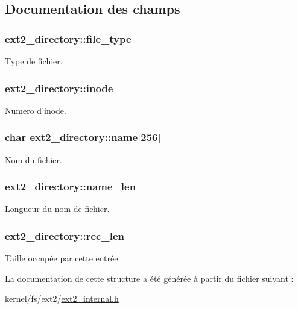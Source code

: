 \subsection{Documentation des champs}
\hypertarget{structext2__directory_a100a0ca76dac23225e9fbaa03b8925d0}{
\subsubsection[{file\+\_\+type}]{ ext2\+\_\+directory\+::file\+\_\+type}}\label{structext2__directory_a100a0ca76dac23225e9fbaa03b8925d0}
Type de fichier. \hypertarget{structext2__directory_a58f91a7939507e98be75baed206c149c}{
\subsubsection[{inode}]{ ext2\+\_\+directory\+::inode}}\label{structext2__directory_a58f91a7939507e98be75baed206c149c}
Numero d'inode. \hypertarget{structext2__directory_a68dde9644a76168693b569434ab17fd4}{
\subsubsection[{name}]{\setlength{\rightskip}{0pt plus 5cm}char ext2\+\_\+directory\+::name\mbox{[}256\mbox{]}}}\label{structext2__directory_a68dde9644a76168693b569434ab17fd4}
Nom du fichier. \hypertarget{structext2__directory_ab2ab4e90da260d09d51d74abdaabb095}{
\subsubsection[{name\+\_\+len}]{ ext2\+\_\+directory\+::name\+\_\+len}}\label{structext2__directory_ab2ab4e90da260d09d51d74abdaabb095}
Longueur du nom de fichier. \hypertarget{structext2__directory_a349e610d4d226a480c577c94b09a5eaf}{
\subsubsection[{rec\+\_\+len}]{ ext2\+\_\+directory\+::rec\+\_\+len}}\label{structext2__directory_a349e610d4d226a480c577c94b09a5eaf}
Taille occupée par cette entrée. 

La documentation de cette structure a été générée à partir du fichier suivant \+:\begin{DoxyCompactItemize}
\item 
kernel/fs/ext2/\hyperlink{ext2__internal_8h}{ext2\+\_\+internal.\+h}\end{DoxyCompactItemize}
